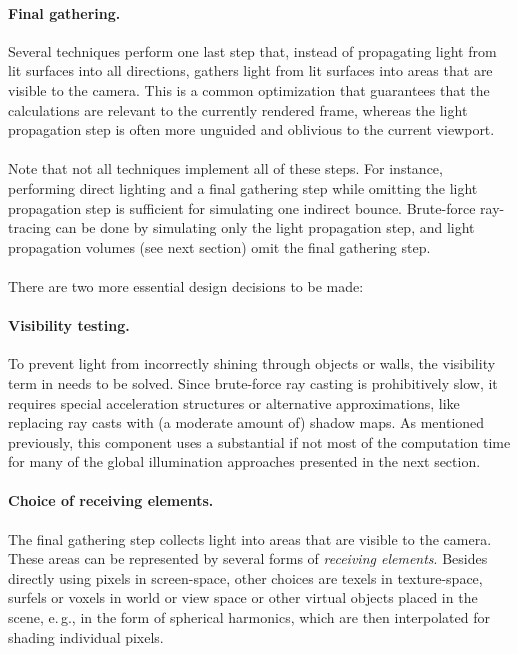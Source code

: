 \paragraph{Final gathering.}
Several techniques perform one last step that, instead of propagating light from lit surfaces into all directions, gathers light from lit surfaces into areas that are visible to the camera. This is a common optimization that guarantees that the calculations are relevant to the currently rendered frame, whereas the light propagation step is often more unguided and oblivious to the current viewport.
\\
\\
Note that not all techniques implement all of these steps. For instance, performing direct lighting and a final gathering step while omitting the light propagation step is sufficient for simulating one indirect bounce. Brute-force ray-tracing can be done by simulating only the light propagation step, and light propagation volumes (see next section) omit the final gathering step.
\\
\\
There are two more essential design decisions to be made:

\paragraph{Visibility testing.}
To prevent light from incorrectly shining through objects or walls, the visibility term in  needs to be solved. Since brute-force ray casting is prohibitively slow, it requires special acceleration structures or alternative approximations, like replacing ray casts with (a moderate amount of) shadow maps. As mentioned previously, this component uses a substantial if not most of the computation time for many of the global illumination approaches presented in the next section.

\paragraph{Choice of receiving elements.}
The final gathering step collects light into areas that are visible to the camera. These areas can be represented by several forms of \textit{receiving elements}. Besides directly using pixels in screen-space, other choices are texels in texture-space, surfels or voxels in world or view space or other virtual objects placed in the scene, e.\,g., in the form of spherical harmonics, which are then interpolated for shading individual pixels.

